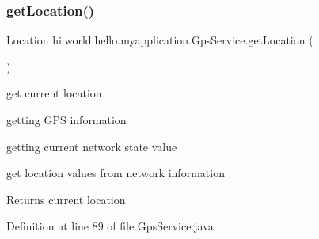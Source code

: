 \begin{DoxyCode}{0}

\end{DoxyCode}
\mbox{\label{classhi_1_1world_1_1hello_1_1myapplication_1_1_gps_service_aa08695320afe385d4473536031c068ef}} 
\subsubsection{\texorpdfstring{getLocation()}{getLocation()}}
{\footnotesize\ttfamily Location hi.\+world.\+hello.\+myapplication.\+Gps\+Service.\+get\+Location (\begin{DoxyParamCaption}{ }\end{DoxyParamCaption})}



get current location 


\begin{DoxyItemize}
\item getting G\+PS information
\item getting current network state value
\item get location values from network information \begin{DoxyReturn}{Returns}
current location 
\end{DoxyReturn}

\end{DoxyItemize}

Definition at line 89 of file Gps\+Service.\+java.


